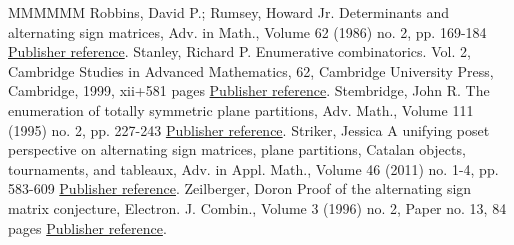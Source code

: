 \begin{thebibliography}{MMMMMM}
 Robbins, David P.; Rumsey, Howard Jr. Determinants and alternating sign matrices, Adv. in Math., Volume 62 (1986) no. 2, pp. 169-184 \href{https://alco.centre-mersenne.org/articles/10.5802/alco.374/#RobbinsRumsey86}{Publisher reference}.
 Stanley, Richard P. Enumerative combinatorics. Vol. 2, Cambridge Studies in Advanced Mathematics, 62, Cambridge University Press, Cambridge, 1999, xii+581 pages \href{https://alco.centre-mersenne.org/articles/10.5802/alco.374/#Stanley99}{Publisher reference}.
 Stembridge, John R. The enumeration of totally symmetric plane partitions, Adv. Math., Volume 111 (1995) no. 2, pp. 227-243 \href{https://alco.centre-mersenne.org/articles/10.5802/alco.374/#Stembridge95}{Publisher reference}.
 Striker, Jessica A unifying poset perspective on alternating sign matrices, plane partitions, Catalan objects, tournaments, and tableaux, Adv. in Appl. Math., Volume 46 (2011) no. 1-4, pp. 583-609 \href{https://alco.centre-mersenne.org/articles/10.5802/alco.374/#Striker11}{Publisher reference}.
 Zeilberger, Doron Proof of the alternating sign matrix conjecture, Electron. J. Combin., Volume 3 (1996) no. 2, Paper no. 13, 84 pages \href{https://alco.centre-mersenne.org/articles/10.5802/alco.374/#Zeilberger96}{Publisher reference}.
\end{thebibliography}
